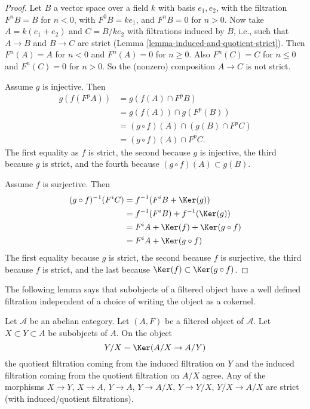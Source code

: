 \begin{proof}
Let $B$ a vector space over a field $k$ with basis $e_1, e_2$, with the
filtration $F^nB = B$ for $n < 0$, with $F^0B = ke_1$, and $F^nB = 0$ for
$n > 0$. Now take $A = k(e_1 + e_2)$ and $C = B/ke_2$ with filtrations
induced by $B$, i.e., such that $A \to B$ and $B \to C$ are strict
(Lemma \ref{lemma-induced-and-quotient-strict}).
Then $F^n(A) = A$ for $n < 0$ and $F^n(A) = 0$ for $n \geq 0$. 
Also $F^n(C) = C$ for $n \leq 0$ and $F^n(C) = 0$ for $n > 0$.
So the (nonzero) composition $A \to C$ is not strict.

\medskip\noindent
Assume $g$ is injective. Then
\begin{align*}
g(f(F^pA)) & = g(f(A) \cap F^pB) \\
& = g(f(A)) \cap g(F^p(B)) \\
& = (g \circ f)(A) \cap (g(B) \cap F^pC) \\
& = (g \circ f)(A) \cap F^pC.
\end{align*}
The first equality as $f$ is strict, the second because $g$ is injective,
the third because $g$ is strict, and the fourth because
$(g \circ f)(A) \subset g(B)$.

\medskip\noindent
Assume $f$ is surjective. Then
\begin{align*}
(g \circ f)^{-1}(F^iC) & = f^{-1}(F^iB + \Ker(g)) \\
& = f^{-1}(F^iB) + f^{-1}(\Ker(g)) \\
& = F^iA + \Ker(f) + \Ker(g \circ f) \\
& = F^iA + \Ker(g \circ f)
\end{align*}
The first equality because $g$ is strict, the second because $f$ is
surjective, the third because $f$ is strict, and the last because
$\Ker(f) \subset \Ker(g \circ f)$.
\end{proof}

\noindent
The following lemma says that subobjects of a filtered object have a well
defined filtration independent of a choice of writing the object as a
cokernel.

\begin{lemma}
\label{lemma-filtration-subobject}
Let $\mathcal{A}$ be an abelian category.
Let $(A, F)$ be a filtered object of $\mathcal{A}$.
Let $X \subset Y \subset A$ be subobjects of $A$.
On the object
$$
Y/X = \Ker(A/X \to A/Y)
$$
the quotient filtration coming from the induced filtration on $Y$ and the
induced filtration coming from the quotient filtration on $A/X$ agree.
Any of the morphisms $X \to Y$, $X \to A$, $Y \to A$, $Y \to A/X$,
$Y \to Y/X$, $Y/X \to A/X$ are strict (with induced/quotient filtrations).
\end{lemma}

